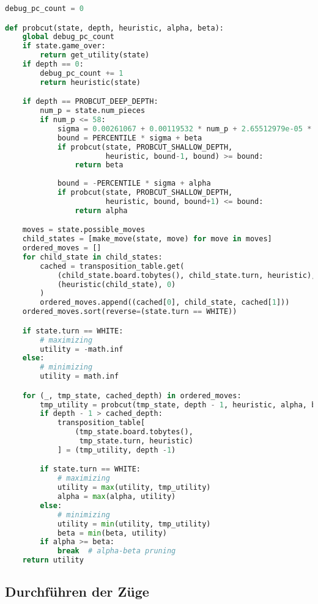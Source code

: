 \begin{lstlisting}[language=Python]
debug_pc_count = 0

def probcut(state, depth, heuristic, alpha, beta):
    global debug_pc_count
    if state.game_over:
        return get_utility(state)
    if depth == 0:
        debug_pc_count += 1
        return heuristic(state)

    if depth == PROBCUT_DEEP_DEPTH:
        num_p = state.num_pieces
        if num_p <= 58:
            sigma = 0.00261067 + 0.00119532 * num_p + 2.65512979e-05 * num_p**2
            bound = PERCENTILE * sigma + beta
            if probcut(state, PROBCUT_SHALLOW_DEPTH,
                       heuristic, bound-1, bound) >= bound:
                return beta
            
            bound = -PERCENTILE * sigma + alpha
            if probcut(state, PROBCUT_SHALLOW_DEPTH,
                       heuristic, bound, bound+1) <= bound:
                return alpha

    moves = state.possible_moves
    child_states = [make_move(state, move) for move in moves]
    ordered_moves = []
    for child_state in child_states:
        cached = transposition_table.get(
            (child_state.board.tobytes(), child_state.turn, heuristic),
            (heuristic(child_state), 0)
        )
        ordered_moves.append((cached[0], child_state, cached[1]))
    ordered_moves.sort(reverse=(state.turn == WHITE))

    if state.turn == WHITE:
        # maximizing
        utility = -math.inf
    else:
        # minimizing
        utility = math.inf

    for (_, tmp_state, cached_depth) in ordered_moves:
        tmp_utility = probcut(tmp_state, depth - 1, heuristic, alpha, beta)
        if depth - 1 > cached_depth:
            transposition_table[
                (tmp_state.board.tobytes(),
                 tmp_state.turn, heuristic)
            ] = (tmp_utility, depth -1)

        if state.turn == WHITE:
            # maximizing
            utility = max(utility, tmp_utility)
            alpha = max(alpha, utility)
        else:
            # minimizing
            utility = min(utility, tmp_utility)
            beta = min(beta, utility)
        if alpha >= beta:
            break  # alpha-beta pruning
    return utility
\end{lstlisting}

\hypertarget{durchfuxfchren-der-zuxfcge}{%
\subsection{Durchführen der Züge}\label{durchfuxfchren-der-zuxfcge}}

